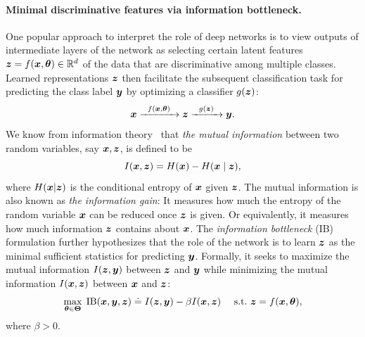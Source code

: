 \documentclass[../../book-main.tex]{subfiles}
\begin{document}
\paragraph{Minimal discriminative features via information bottleneck.}
One popular approach to interpret the role of deep networks is to view outputs of intermediate layers of the network as selecting certain latent features $\bm{z} = f(\bm{x}, \bm \theta) \in \mathbb{R}^d$ of the data that are discriminative among multiple classes. Learned representations $\bm{z}$ then  facilitate the subsequent classification task for predicting the class label $\bm{y}$ by optimizing a classifier $g(\bm{z})$:
\begin{equation}
	\bm{x}   \xrightarrow{\hspace{2mm} f(\bm{x}, \bm \theta)\hspace{2mm}} \bm{z}  \xrightarrow{\hspace{2mm} g(\bm{z}) \hspace{2mm}} \bm{y}.
\end{equation}
We know from information theory~\cite{Cover-Thomas} that {\em the mutual information} between two random variables, say $\bm{x},\bm{z}$, is defined to be
\begin{equation}
	I(\bm{x}, \bm{z}) = H(\bm{x}) - H(\bm{x}\mid \bm{z}),
\end{equation}
where $H(\bm{x} \vert \bm{z})$ is the conditional entropy of $\bm{x}$ given $\bm{z}$. The mutual information is also known as {\em the information gain}: It measures how much the entropy of the random variable $\bm{x}$ can be reduced once $\bm{z}$ is given. Or equivalently, it measures how much information $\bm{z}$ contains about $\bm{x}$.  The {\em information bottleneck} (IB) formulation \cite{Tishby-ITW2015} further hypothesizes that the role of the network is to learn $\bm{z}$ as the minimal sufficient statistics for predicting $\bm{y}$. Formally, it seeks to maximize the mutual information $I(\bm{z}, \bm{y})$
between $\bm{z}$ and $\bm{y}$ while minimizing the mutual information $I(\bm{x}, \bm{z})$ between $\bm{x}$ and $\bm{z}$:
\begin{equation}
	\max_{\bm \theta\in \bm \Theta}\; \mbox{IB}(\bm{x}, \bm{y}, \bm{z}) \doteq I(\bm{z}, \bm{y}) - \beta I(\bm{x}, \bm{z}) \quad\ \mathrm{s.t.}\ \bm{z} = f(\bm{x}, \bm \theta),
	\label{chap4-eqn:information-bottleneck}
\end{equation}
where $\beta >0$. 
\end{document}
